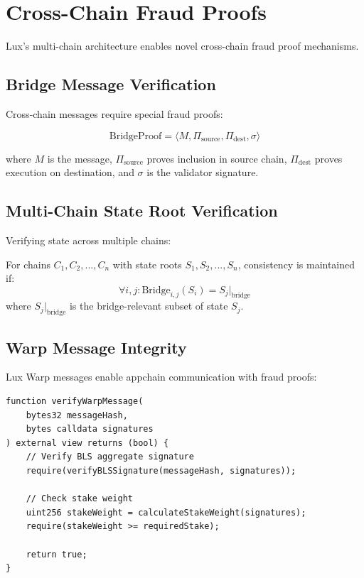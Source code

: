 \section{Cross-Chain Fraud Proofs}


Lux's multi-chain architecture enables novel cross-chain fraud proof mechanisms.

\subsection{Bridge Message Verification}

Cross-chain messages require special fraud proofs:

\begin{equation}
\text{BridgeProof} = \langle M, \Pi_{\text{source}}, \Pi_{\text{dest}}, \sigma \rangle
\end{equation}

where $M$ is the message, $\Pi_{\text{source}}$ proves inclusion in source chain, $\Pi_{\text{dest}}$ proves execution on destination, and $\sigma$ is the validator signature.

\subsection{Multi-Chain State Root Verification}

Verifying state across multiple chains:

\begin{theorem}
For chains $C_1, C_2, ..., C_n$ with state roots $S_1, S_2, ..., S_n$, consistency is maintained if:
\begin{equation}
\forall i,j : \text{Bridge}_{i,j}(S_i) = S_j|_{\text{bridge}}
\end{equation}
where $S_j|_{\text{bridge}}$ is the bridge-relevant subset of state $S_j$.
\end{theorem}

\subsection{Warp Message Integrity}

Lux Warp messages enable appchain communication with fraud proofs:

\begin{lstlisting}[language=Solidity, caption=Warp Message Verification]
function verifyWarpMessage(
    bytes32 messageHash,
    bytes calldata signatures
) external view returns (bool) {
    // Verify BLS aggregate signature
    require(verifyBLSSignature(messageHash, signatures));
    
    // Check stake weight
    uint256 stakeWeight = calculateStakeWeight(signatures);
    require(stakeWeight >= requiredStake);
    
    return true;
}
\end{lstlisting}

